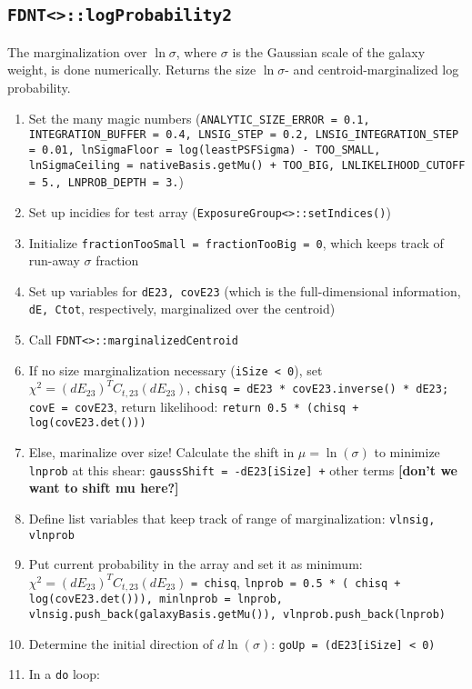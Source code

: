 \documentclass[useAMS,usenatbib,usegraphicx]{mn2e}
\begin{document}
\subsection{\texttt{FDNT<>::logProbability2}}
The marginalization over $\ln\sigma$, where $\sigma$ is the Gaussian scale of the galaxy weight,
is done numerically.  Returns the size $\ln\sigma$- and centroid-marginalized log probability.
\begin{enumerate}
\item Set the many magic numbers ({\tt ANALYTIC\_SIZE\_ERROR = 0.1, INTEGRATION\_BUFFER = 0.4,
LNSIG\_STEP = 0.2, LNSIG\_INTEGRATION\_STEP = 0.01, lnSigmaFloor = log(leastPSFSigma) - TOO\_SMALL,
lnSigmaCeiling = nativeBasis.getMu() + TOO\_BIG, LNLIKELIHOOD\_CUTOFF = 5., LNPROB\_DEPTH = 3.})
\item Set up incidies for test array ({\tt ExposureGroup<>::setIndices()})
\item Initialize {\tt fractionTooSmall = fractionTooBig = 0}, which keeps track of run-away $\sigma$
  fraction
\item Set up variables for {\tt dE23, covE23} (which is the full-dimensional information, 
  {\tt dE, Ctot}, respectively, marginalized over the centroid)
\item Call {\tt FDNT<>::marginalizedCentroid} 
\item If no size marginalization necessary ({\tt iSize < 0}), set 
  $\chi^2 = \left(dE_{23}\right)^T C_{t,23} \left(dE_{23}\right)$, {\tt chisq = dE23 * 
  covE23.inverse() * dE23; covE = covE23}, return likelihood: {\tt return 0.5 * (chisq + 
log(covE23.det()))}
\item Else, marinalize over size!  Calculate the shift in $\mu = \ln(\sigma)$ to minimize
{\tt lnprob} at this shear: {\tt gaussShift = -dE23[iSize] +} other terms
{\bf [don't we want to shift mu here?]}
\item Define list variables that keep track of range of marginalization: {\tt vlnsig, vlnprob}
\item Put current probability in the array and set it as minimum: 
  $\chi^2 = \left(dE_{23}\right)^T C_{t,23} \left(dE_{23}\right)$ {\tt = chisq},
  {\tt lnprob = 0.5 * ( chisq + log(covE23.det())), minlnprob = lnprob,
    vlnsig.push\_back(galaxyBasis.getMu()), vlnprob.push\_back(lnprob)}
\item Determine the initial direction of $d\ln(\sigma)$: {\tt goUp = (dE23[iSize] < 0)}
\item In a {\tt do} loop:
  \begin{itemize}

\end{itemize}
\end{enumerate}
\end{document}
